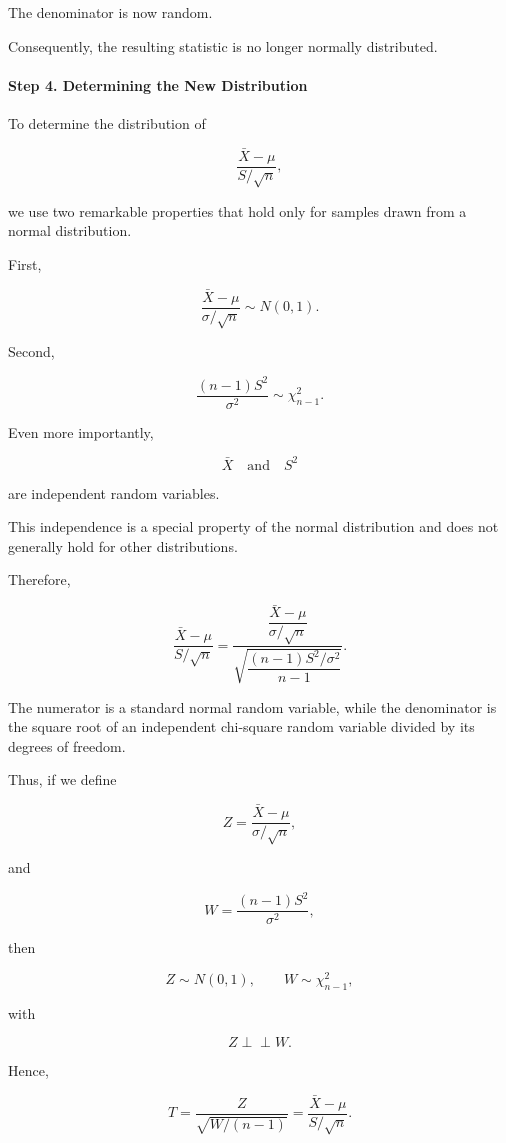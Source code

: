 \documentclass[11pt]{article}
\begin{document}
\begin{mdframed}[
		linewidth=0.8pt,
		roundcorner=6pt,
		backgroundcolor=gray!5,
		linecolor=gray!60,
		innertopmargin=10pt,
		innerbottommargin=10pt,
		innerleftmargin=10pt,
		innerrightmargin=10pt
		]
		The denominator is now random.
		
		Consequently, the resulting statistic is no longer normally distributed.
		
		\paragraph{Step 4. Determining the New Distribution}
		
		To determine the distribution of
		
		\[
		\frac{\bar X-\mu}
		{S/\sqrt n},
		\]
		
		we use two remarkable properties that hold only for samples drawn from a
		normal distribution.
		
		First,
		
		\[
		\frac{\bar X-\mu}
		{\sigma/\sqrt n}
		\sim
		N(0,1).
		\]
		
		Second,
		
		\[
		\frac{(n-1)S^2}{\sigma^2}
		\sim
		\chi^2_{n-1}.
		\]
		
		Even more importantly,
		
		\[
		\bar X
		\quad\text{and}\quad
		S^2
		\]
		
		are independent random variables.
		
		This independence is a special property of the normal distribution and does
		not generally hold for other distributions.
		
		Therefore,
		
		\[
		\frac{\bar X-\mu}
		{S/\sqrt n}
		=
		\frac{
			\dfrac{\bar X-\mu}{\sigma/\sqrt n}
		}
		{
			\sqrt{
				\dfrac{(n-1)S^2/\sigma^2}{n-1}
			}
		}.
		\]
		
		The numerator is a standard normal random variable, while the denominator
		is the square root of an independent chi-square random variable divided by
		its degrees of freedom.
		
		Thus, if we define
		
		\[
		Z
		=
		\frac{\bar X-\mu}
		{\sigma/\sqrt n},
		\]
		
		and
		
		\[
		W
		=
		\frac{(n-1)S^2}{\sigma^2},
		\]
		
		then
		
		\[
		Z\sim N(0,1),
		\qquad
		W\sim\chi^2_{n-1},
		\]
		
		with
		
		\[
		Z
		\perp\!\!\!\perp
		W.
		\]
		
		Hence,
		
		\[
		\boxed{
			T
			=
			\frac{Z}
			{\sqrt{W/(n-1)}}
			=
			\frac{\bar X-\mu}
			{S/\sqrt n}.
		}
		\]
		

\end{mdframed}
\end{document}
